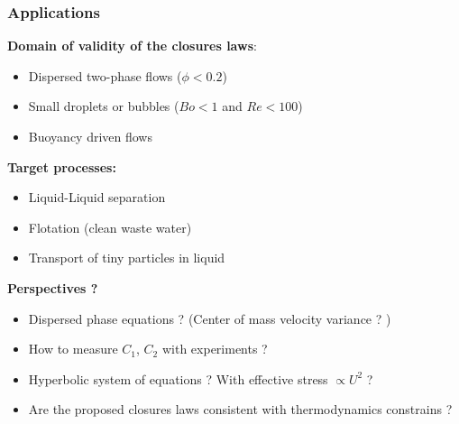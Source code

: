 \documentclass{sintefbeamer}
\begin{document}
\begin{frame}
  \frametitle{Applications}
\textbf{Domain of validity of the closures laws}:
  \begin{itemize}
    \item Dispersed two-phase flows ($\phi < 0.2$)
    \item Small droplets or bubbles ($Bo < 1$ and $Re < 100$)
    \item Buoyancy driven flows
  \end{itemize}
\vfill
  \textbf{Target processes:  }
  \begin{itemize}
    \item Liquid-Liquid separation
    \item Flotation (clean waste water)
    \item Transport of tiny particles in liquid
  \end{itemize}

\end{frame}


\begin{frame}
  \centering
  {\Huge\textbf{Perspectives ? }}

  \begin{itemize}
    \item Dispersed phase equations ? (Center of mass velocity variance ? )
    \item How to measure $C_1$, $C_2$ with experiments  ?
    \item Hyperbolic system of equations ? With effective stress $\propto U^2$ ?
    \item Are the proposed closures laws consistent with thermodynamics constrains ?
  \end{itemize}

\end{frame}
\backmatter

\begin{frame}
  \footnotesize

  

\end{frame}
\end{document}
